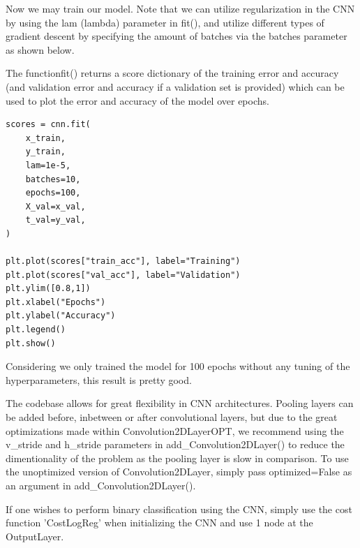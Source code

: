 \documentclass[%
oneside,                 %
final,                   %
10pt]{article}
\begin{document}
Now we may train our model. Note that we can utilize regularization in
the CNN by using the lam (lambda) parameter in fit(), and utilize
different types of gradient descent by specifying the amount of
batches via the batches parameter as shown below.

The functionfit() returns a score dictionary of the training error and
accuracy (and validation error and accuracy if a validation set is
provided) which can be used to plot the error and accuracy of the
model over epochs.



















\begin{verbatim}
scores = cnn.fit(
    x_train,
    y_train,
    lam=1e-5,
    batches=10,
    epochs=100,
    X_val=x_val,
    t_val=y_val,
)

plt.plot(scores["train_acc"], label="Training")
plt.plot(scores["val_acc"], label="Validation")
plt.ylim([0.8,1])
plt.xlabel("Epochs")
plt.ylabel("Accuracy")
plt.legend()
plt.show()

\end{verbatim}


Considering we only trained the model for 100 epochs without any tuning of the hyperparameters, this result is pretty good.

The codebase allows for great flexibility in CNN
architectures. Pooling layers can be added before, inbetween or after
convolutional layers, but due to the great optimizations made within
Convolution2DLayerOPT, we recommend using the v_stride and h_stride
parameters in add_Convolution2DLayer() to reduce the dimentionality of
the problem as the pooling layer is slow in comparison. To use the
unoptimized version of Convolution2DLayer, simply pass optimized=False
as an argument in add_Convolution2DLayer().

If one wishes to perform binary classification using the CNN, simply
use the cost function 'CostLogReg' when initializing the CNN and use 1
node at the OutputLayer.
\end{document}
